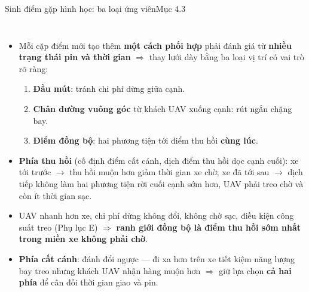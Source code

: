\documentclass[aspectratio=169,10pt,t,xcolor={table}]{beamer}
\newcommand{\src}[1]{\hfill{\normalfont\footnotesize\color{white!62!navy}#1}}  %
\begin{document}
\begin{frame}{Sinh điểm gặp hình học: ba loại ứng viên\src{Mục 4.3}}
\begin{columns}[T,onlytextwidth]
\begin{itemize}\scriptsize
\item Mỗi cặp điểm mới tạo thêm \textbf{một cách phối hợp} phải đánh giá từ \textbf{nhiều trạng thái pin và thời gian} $\Rightarrow$ thay lưới dày bằng ba loại vị trí có vai trò rõ ràng:
\begin{enumerate}
\item \textbf{Đầu mút}: tránh chi phí dừng giữa cạnh.
\item \textbf{Chân đường vuông góc} từ khách UAV xuống cạnh: rút ngắn chặng bay.
\item \textbf{Điểm đồng bộ}: hai phương tiện tới điểm thu hồi \textbf{cùng lúc}.
\end{enumerate}
\item \textbf{Phía thu hồi} (cố định điểm cất cánh, dịch điểm thu hồi dọc cạnh cuối): xe tới trước $\to$ thu hồi muộn hơn giảm thời gian xe chờ; xe đã tới sau $\to$ dịch tiếp không làm hai phương tiện rời cuối cạnh sớm hơn, UAV phải treo chờ và còn ít thời gian sạc.
\item UAV nhanh hơn xe, chi phí dừng không đổi, không chờ sạc, điều kiện công suất treo (Phụ lục E) $\Rightarrow$ \textbf{ranh giới đồng bộ là điểm thu hồi sớm nhất trong miền xe không phải chờ}.
\item \textbf{Phía cất cánh}: đánh đổi ngược --- đi xa hơn trên xe tiết kiệm năng lượng bay treo nhưng khách UAV nhận hàng muộn hơn $\Rightarrow$ giữ lựa chọn \textbf{cả hai phía} để cân đối thời gian giao và pin.
\end{itemize}
\centering
{}
\vspace{4pt}


\end{columns}
\end{frame}
\end{document}
